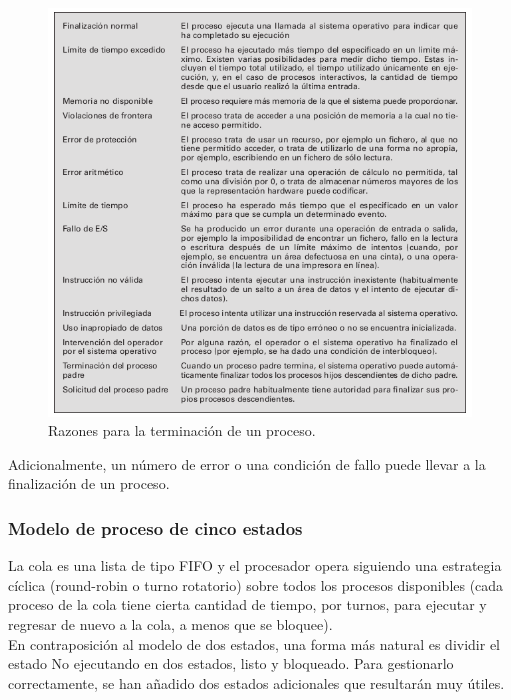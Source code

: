 \documentclass{article}
\begin{document}
				\begin{figure}
				\caption{Razones para la terminación de un proceso.}
				\label{figura2.3:terminaciónprocesos}
				\centering
				\includegraphics[width=1.2\textwidth, scale=1]{tema_2_figura3.png}
				\end{figure}	
				
				Adicionalmente, un número de error o una condición de fallo puede llevar a la finalización de un proceso. \\
				
			\subsubsection{Modelo de proceso de cinco estados}
				La cola es una lista de tipo FIFO y el procesador opera siguiendo una
estrategia cíclica (round-robin o turno rotatorio) sobre todos los procesos disponibles (cada proceso
de la cola tiene cierta cantidad de tiempo, por turnos, para ejecutar y regresar de nuevo a la cola, a
menos que se bloquee).	 \\

				En contraposición al modelo de dos estados, una forma más natural es dividir el estado No ejecutando en dos estados, listo y bloqueado. Para gestionarlo correctamente, se han añadido dos estados adicionales que resultarán muy útiles. 
				
\end{document}
